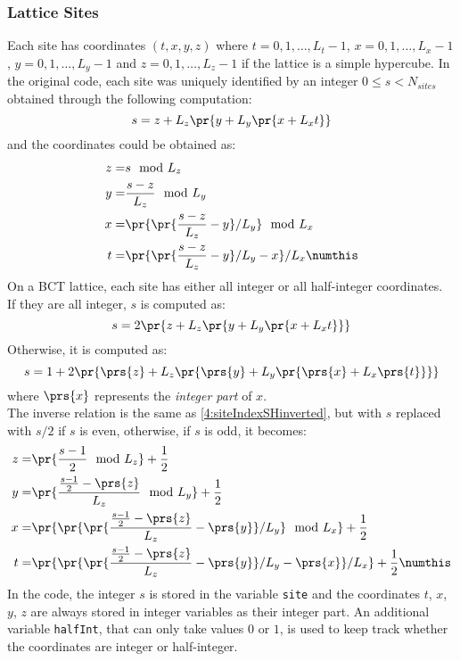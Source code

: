 \subsubsection{Lattice Sites}
Each site has coordinates $(t,x,y,z)$ where $t = 0, 1, \dots, L_t-1$, $x = 0, 1, \dots, L_x-1$, $y = 0, 1, \dots, L_y-1$ and $z = 0, 1, \dots, L_z-1$ if the lattice is a simple hypercube.
In the original code, each site was uniquely identified by an integer $0 \leq s < N_{sites}$ obtained through the following computation:
\begin{equation}
    s = z + L_z\pr{y + L_y\pr{x + L_xt}} \label{4:siteIndexSH}
\end{equation}
and the coordinates could be obtained as:
\begin{align*}
    z =& s \mod L_z \\
    y =& \frac{s - z}{L_z} \mod L_y \\
    x =& \pr{\pr{\frac{s - z}{L_z} - y}/L_y} \mod L_x \\
    t =& \pr{\pr{\frac{s - z}{L_z} - y}/L_y - x}/L_x \numthis\label{4:siteIndexSHinverted}
\end{align*}
On a BCT lattice, each site has either all integer or all half-integer coordinates.\\
If they are all integer, $s$ is computed as:
\begin{equation}
    s = 2\pr{z + L_z\pr{y + L_y\pr{x + L_xt}}} \label{4:siteIndexBCTeven}
\end{equation}
Otherwise, it is computed as:
\begin{equation}
    s = 1 + 2\pr{\prs{z} + L_z\pr{\prs{y} + L_y\pr{\prs{x} + L_x\prs{t}}}} \label{4:siteIndexBCTodd}
\end{equation}
where $\prs{x}$ represents the \emph{integer part} of $x$.\\
The inverse relation is the same as \eqref{4:siteIndexSHinverted}, but with $s$ replaced with $s/2$ if $s$ is even, otherwise, if $s$ is odd, it becomes:
\begin{align*}
    z =& \pr{\frac{s-1}{2} \mod L_z} + \frac12 \\
    y =& \pr{\frac{\frac{s-1}{2} - \prs{z}}{L_z} \mod L_y} + \frac12 \\
    x =& \pr{\pr{\pr{\frac{\frac{s-1}{2} - \prs{z}}{L_z} - \prs{y}}/L_y} \mod L_x} + \frac12 \\
    t =& \pr{\pr{\pr{\frac{\frac{s-1}{2} - \prs{z}}{L_z} - \prs{y}}/L_y - \prs{x}}/L_x} + \frac12 \numthis\label{4:siteIndexBCToddInverted}
\end{align*}
In the code, the integer $s$ is stored in the variable \texttt{site} and the coordinates $t$, $x$, $y$, $z$ are always stored in integer variables as their integer part.
An additional variable \texttt{halfInt}, that can only take values $0$ or $1$, is used to keep track whether the coordinates are integer or half-integer.

